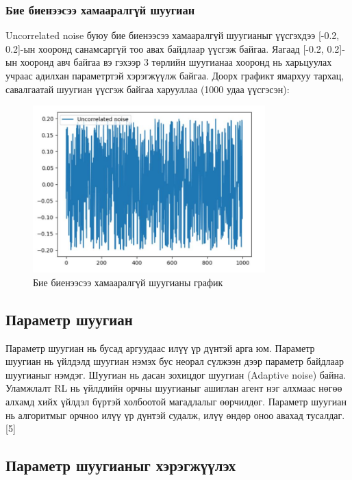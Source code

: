 \documentclass[12pt,A4]{report}
\begin{document}
\subsubsection{Бие биенээсээ хамааралгүй шуугиан}

Uncorrelated noise буюу бие биенээсээ хамааралгүй шуугианыг үүсгэхдээ [-0.2, 0.2]-ын хооронд санамсаргүй тоо авах байдлаар үүсгэж байгаа. Яагаад [-0.2, 0.2]-ын хооронд авч байгаа вэ гэхээр 3 төрлийн шуугианаа хооронд нь харьцуулах учраас адилхан параметртэй хэрэгжүүлж байгаа. Доорх графикт ямархуу тархац, савалгаатай шуугиан үүсгэж байгаа харууллаа (1000 удаа үүсгэсэн):

\begin{figure}[H]
\centering
\includegraphics[width=0.8\textwidth]{./images/Uncorrelated_noise}
\caption{Бие биенээсээ хамааралгүй шуугианы график}
\end{figure}

\subsection{Параметр шуугиан}
 
Параметр шуугиан нь бусад аргуудаас илүү үр дүнтэй арга юм. Параметр шуугиан нь үйлдэлд шуугиан нэмэх бус неорал сүлжээн дээр параметр байдлаар шуугианыг нэмдэг. Шуугиан нь дасан зохицдог шуугиан (Adaptive noise) байна. Уламжлалт RL нь үйлдлийн орчны шуугианыг ашиглан агент нэг алхмаас нөгөө алхамд хийх үйлдэл бүртэй холбоотой магадлалыг өөрчилдөг. Параметр шуугиан нь алгоритмыг орчноо илүү үр дүнтэй судалж, илүү өндөр оноо авахад тусалдаг. [5]

\subsection{Параметр шуугианыг хэрэгжүүлэх}
\end{document}
